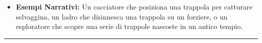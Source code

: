 \documentclass[../manuale_main.tex]{subfiles}
\begin{document}
\begin{itemize}
\item \textbf{Esempi Narrativi:} Un cacciatore che posiziona una trappola per catturare selvaggina, un ladro che disinnesca una trappola su un forziere, o un esploratore che scopre una serie di trappole nascoste in un antico tempio.
\end{itemize}

\vspace{0.5cm}\rule{\textwidth}{0.4pt}\vspace{0.5cm}


\end{document}
